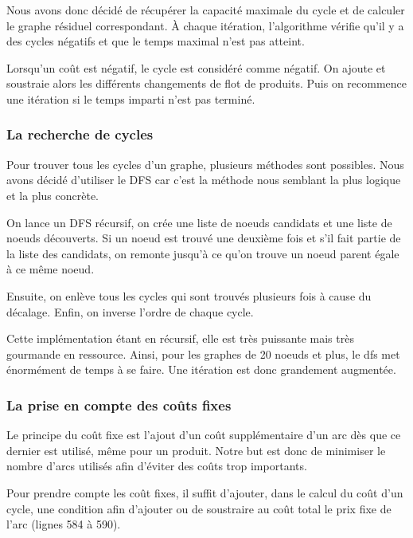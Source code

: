 \documentclass[a4paper,12pt]{article}
\begin{document}
Nous avons donc d\'ecid\'e de r\'ecup\'erer la capacit\'e maximale du cycle et de calculer le graphe r\'esiduel correspondant. \`A chaque it\'eration, l'algorithme v\'erifie qu'il y a des cycles n\'egatifs et que le temps maximal n'est pas atteint.

Lorsqu'un co\^ut est n\'egatif, le cycle est consid\'er\'e comme n\'egatif. On ajoute et soustraie alors les diff\'erents changements de flot de produits. Puis on recommence une it\'eration si le temps imparti n'est pas termin\'e.

\subsubsection{La recherche de cycles}

Pour trouver tous les cycles d'un graphe, plusieurs m\'ethodes sont possibles. Nous avons d\'ecid\'e d'utiliser le DFS car c'est la m\'ethode nous semblant la plus logique et la plus concr\`ete.

On lance un DFS r\'ecursif, on cr\'ee une liste de noeuds candidats et une liste de noeuds d\'ecouverts. Si un noeud est trouv\'e une deuxi\`eme fois et s'il fait partie de la liste des candidats, on remonte jusqu'\`a ce qu'on trouve un noeud parent \'egale \`a ce m\^eme noeud.

Ensuite, on enl\`eve tous les cycles qui sont trouv\'es plusieurs fois \`a cause du d\'ecalage. Enfin, on inverse l'ordre de chaque cycle.

Cette impl\'ementation \'etant en r\'ecursif, elle est tr\`es puissante mais tr\`es gourmande en ressource. Ainsi, pour les graphes de 20 noeuds et plus, le dfs met \'enorm\'ement de temps \`a se faire. Une it\'eration est donc grandement augment\'ee.

\subsubsection{La prise en compte des co\^uts fixes}

Le principe du co\^ut fixe est l'ajout d'un co\^ut suppl\'ementaire d'un arc d\`es que ce dernier est utilis\'e, m\^eme pour un produit. Notre but est donc de minimiser le nombre d'arcs utilis\'es afin d'\'eviter des co\^uts trop importants.

Pour prendre compte les co\^ut fixes, il suffit d'ajouter, dans le calcul du co\^ut d'un cycle, une condition afin d'ajouter ou de soustraire au co\^ut total le prix fixe de l'arc (lignes 584 \`a 590).
\end{document}
